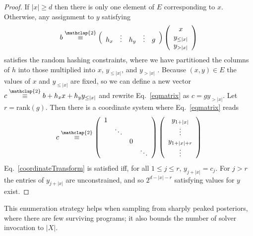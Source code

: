 \documentclass{article}
\newcommand\modt{\stackrel{\mathclap{\normalfont 2}}{\equiv}}
\begin{document}
  \begin{proof}
    If $\lvert x \rvert \geq d$ then there is only one element of $E$ corresponding to $x$.
    Otherwise,
    any assignment to $y$ satisfying
    \begin{equation}\label{eqmatrix}
      b \modt \left( \begin{array}{ccccc}
h_{x} & \vdots& h_{y} &\vdots& g %
      \end{array} \right) \left( \begin{array}{c}
x \\
y_{\leq \lvert x \rvert } \\
y_{ > \lvert x \rvert }  \end{array} \right)
    \end{equation}
    satisfies the random hashing constraints, where we have partitioned the columns of $h$ into those multiplied into $x$, $y_{\leq\lvert x \rvert }$, and $y_{ > \lvert x \rvert }$ .
    Because $(x,y)\in E$ the values of $x$ and $y_{\leq \lvert x \rvert }$ are fixed,
    so we can define a new vector $c \modt b + h_x x + h_y y_{\leq \lvert x \rvert }$ and rewrite Eq.~\ref{eqmatrix} as
    $c = g y_{ > \lvert x \rvert }$.
    Let $r = \text{rank}(g)$.
    Then there is a coordinate system where Eq.~\ref{eqmatrix} reads
    \begin{equation}\label{coordinateTransform}
      c \modt \left( \begin{array}{cccc}
        1&&&\\
        &\ddots&&\\
        &&0&\\
        &&&\ddots \end{array} \right) \left( \begin{array}{c}
        y_{1+\lvert x \rvert } \\
        \vdots\\
        y_{1+\lvert x \rvert +r}\\
        \vdots\end{array} \right)
    \end{equation}
    Eq.~\ref{coordinateTransform}     is satisfied iff, for all $1\leq j\leq r$, $y_{j+\lvert x \rvert } = c_j$.
    For $j > r$ the entries of $y_{j+\lvert x \rvert } $ are unconstrained,
    and so $2^{d  - \lvert x \rvert  - r}$  satisfying values for $y$ exist.
  \end{proof}
  This enumeration strategy helps when sampling from sharply peaked posteriors,
  where there are few surviving programs; it also bounds the number of solver invocation to $|X|$.
\end{document}
